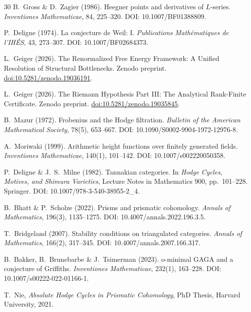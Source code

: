 \documentclass[aps,prd,twocolumn,superscriptaddress,nofootinbib]{revtex4-2}
\theoremstyle{definition}
\theoremstyle{remark}
\begin{document}
\begin{thebibliography}{30}
B.~Gross \& D.~Zagier (1986).
Heegner points and derivatives of $L$-series.
\textit{Inventiones Mathematicae}, 84, 225--320.
DOI: 10.1007/BF01388809.

P.~Deligne (1974).
La conjecture de Weil: I.
\textit{Publications Math\'ematiques de l'IH\'ES}, 43, 273--307.
DOI: 10.1007/BF02684373.

L.~Geiger (2026).
The Renormalized Free Energy Framework: A Unified Resolution of Structural Bottlenecks.
Zenodo preprint.
\href{https://doi.org/10.5281/zenodo.19036191}{doi:10.5281/zenodo.19036191}.

L.~Geiger (2026).
The Riemann Hypothesis Part III: The Analytical Rank-Finite Certificate.
Zenodo preprint.
\href{https://doi.org/10.5281/zenodo.19035845}{doi:10.5281/zenodo.19035845}.

B.~Mazur (1972).
Frobenius and the Hodge filtration.
\textit{Bulletin of the American Mathematical Society}, 78(5), 653--667.
DOI: 10.1090/S0002-9904-1972-12976-8.

A.~Moriwaki (1999).
Arithmetic height functions over finitely generated fields.
\textit{Inventiones Mathematicae}, 140(1), 101--142.
DOI: 10.1007/s002220050358.

P.~Deligne \& J.~S.~Milne (1982).
Tannakian categories.
In \textit{Hodge Cycles, Motives, and Shimura Varieties}, Lecture Notes in Mathematics 900, pp.\ 101--228. Springer.
DOI: 10.1007/978-3-540-38955-2\_4.

B.~Bhatt \& P.~Scholze (2022).
Prisms and prismatic cohomology.
\textit{Annals of Mathematics}, 196(3), 1135--1275.
DOI: 10.4007/annals.2022.196.3.5.

T.~Bridgeland (2007).
Stability conditions on triangulated categories.
\textit{Annals of Mathematics}, 166(2), 317--345.
DOI: 10.4007/annals.2007.166.317.

B.~Bakker, B.~Brunebarbe \& J.~Tsimerman (2023).
o-minimal GAGA and a conjecture of Griffiths.
\textit{Inventiones Mathematicae}, 232(1), 163--228.
DOI: 10.1007/s00222-022-01166-1.

 T.~Nie, \textit{Absolute Hodge Cycles in Prismatic Cohomology}, PhD Thesis, Harvard University, 2021.

\end{thebibliography}
\end{document}
